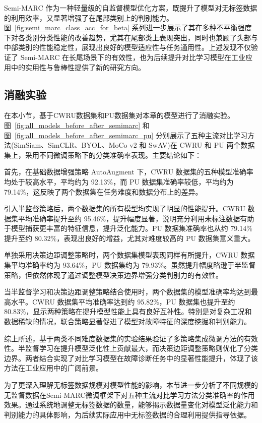\documentclass[master]{thesis-uestc}
\begin{document}
Semi-MARC 作为一种轻量级的自监督模型优化方案，既提升了模型对无标签数据的利用效率，又显著增强了在尾部类别上的判别能力。图~\ref{fig:semi_marc_class_acc_for_beta} 系列进一步展示了其在多种不平衡强度下对各类别分类性能的改善趋势，尤其在尾部类上表现突出，同时也兼顾了头部与中部类别的性能稳定性，展现出良好的模型适应性与任务通用性。上述发现不仅验证了 Semi-MARC 在长尾场景下的有效性，也为后续提升对比学习模型在工业应用中的实用性与鲁棒性提供了新的研究方向。


\subsection{消融实验}
在本小节，基于CWRU数据集和PU数据集对本章的模型进行了消融实验。
图~\ref{fig:all_models_before_after_semimarc} 和图~\ref{fig:all_models_before_after_semimarc_pu} 分别展示了五种主流对比学习方法(SimSiam、SimCLR、BYOL、MoCo v2 和 SwAV)在 CWRU 和 PU 两个数据集上，采用不同微调策略下的分类准确率表现。主要结论如下：

首先，在基础数据增强策略 AutoAugment 下，CWRU 数据集的五种模型准确率均处于较高水平，平均约为 92.13\%，而 PU 数据集准确率较低，平均约为 79.14\%，这反映了两个数据集在任务难度和数据分布上的差异。

引入半监督策略后，两个数据集的所有模型均实现了明显的性能提升。CWRU 数据集平均准确率提升至约 95.46\%，提升幅度显著，说明充分利用未标注数据有助于模型捕获更丰富的特征信息，提升泛化能力。PU 数据集准确率也从约 79.14\% 提升至约 80.32\%，表现出良好的增益，尤其对难度较高的 PU 数据集意义重大。

单独采用决策边距调整策略时，两个数据集模型表现同样有所提升，CWRU 数据集平均准确率约为 93.64\%，PU 数据集约为 79.93\%。虽然提升幅度略逊于半监督策略，但依然体现了通过调整模型决策边界增强分类判别力的有效性。

当半监督学习和决策边距调整策略结合使用时，两个数据集的模型准确率均达到最高水平。CWRU 数据集平均准确率达到约 95.82\%，PU 数据集也提升至约 80.83\%，显示两种策略在提升模型性能上具有良好互补性。特别是对复杂工况和数据稀缺的情况，联合策略显著促进了模型对故障特征的深度挖掘和判别能力。

综上所述，基于两类不同难度数据集的实验结果验证了多策略集成微调方法的有效性。半监督学习在提升模型泛化性上贡献最大，而决策边距调整策略则优化了分类边界。两者结合实现了对比学习模型在故障诊断任务中的显著性能提升，体现了该方法在工业应用中的广阔前景。

为了更深入理解无标签数据规模对模型性能的影响，本节进一步分析了不同规模的无监督数据在Semi-MARC微调框架下对五种主流对比学习方法分类准确率的作用效果。通过系统地调整无标签数据的数量，能够揭示数据量变化对模型泛化能力和判别能力的具体影响，为后续实际应用中无标签数据的合理利用提供指导依据。
\end{document}
